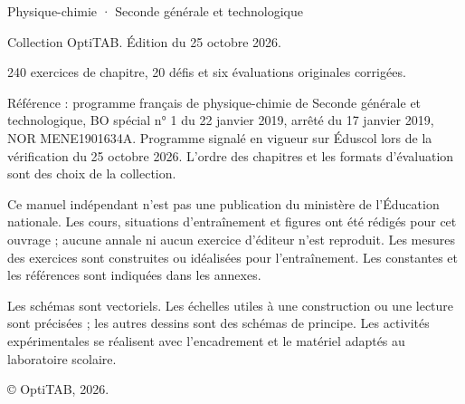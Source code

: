 \thispagestyle{empty}\vspace*{\fill}
\begin{minipage}{135mm}\fontsize{9.5}{14}\selectfont\color{otMuted}
{\otSemi\color{otInk}Physique-chimie · Seconde générale et technologique}\par\medskip
Collection OptiTAB. Édition du 25 octobre 2026.\par
240 exercices de chapitre, 20 défis et six évaluations originales corrigées.\par\medskip
Référence : programme français de physique-chimie de Seconde générale et technologique,
BO spécial n° 1 du 22 janvier 2019, arrêté du 17 janvier 2019, NOR MENE1901634A.
Programme signalé en vigueur sur Éduscol lors de la vérification du 25 octobre 2026.
L'ordre des chapitres et les formats d'évaluation sont des choix de la collection.\par\medskip
Ce manuel indépendant n'est pas une publication du ministère de l'Éducation nationale.
Les cours, situations d'entraînement et figures ont été rédigés pour cet ouvrage ; aucune
annale ni aucun exercice d'éditeur n'est reproduit. Les mesures des exercices sont construites
ou idéalisées pour l'entraînement. Les constantes et les références sont indiquées dans les annexes.\par\medskip
Les schémas sont vectoriels. Les échelles utiles à une construction ou une lecture sont précisées ;
les autres dessins sont des schémas de principe. Les activités expérimentales se réalisent
avec l'encadrement et le matériel adaptés au laboratoire scolaire.\par\medskip
© OptiTAB, 2026.\quad\otSite
\end{minipage}\clearpage

